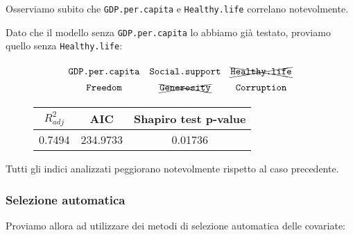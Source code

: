 \documentclass{beamer}
\begin{document}
\begin{frame}
    Osserviamo subito che \texttt{GDP.per.capita} e \texttt{Healthy.life} correlano notevolmente.

    \bigskip

    Dato che il modello senza \texttt{GDP.per.capita} lo abbiamo già testato, proviamo quello senza \texttt{Healthy.life}:
\end{frame}

\begin{frame}
    \begin{equation*}
    {\renewcommand*{\arraystretch}{1.4}
    \begin{array}{ccc}
    {\texttt{GDP.per.capita}} & {\texttt{Social.support}} & \xcancel{\texttt{Healthy.life}} \\
    {\texttt{Freedom}}        & \xcancel{\texttt{Generosity}}     & {\texttt{Corruption}}
    \end{array}}
    \end{equation*}

    \begin{figure}[h]
    \centering
    {\renewcommand\arraystretch{1.6}
    \begin{tabular}{|c|c|c|}
    \hline
    $R^2_{adj}$ & AIC & Shapiro test p-value \\
    \hline
    0.7494   & 234.9733 & 0.01736 \\
    \hline
    \end{tabular}}
    \end{figure}

    Tutti gli indici analizzati peggiorano notevolmente rispetto al caso precedente.
\end{frame}

\begin{frame}
    \frametitle{Selezione automatica}
    Proviamo allora ad utilizzare dei metodi di selezione automatica delle covariate:
\end{frame}
\end{document}
